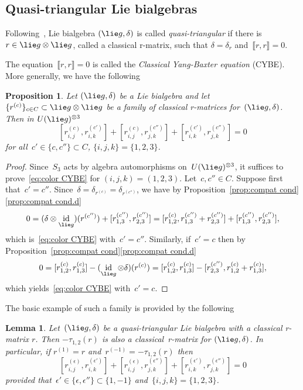 \documentclass[12pt, reqno]{amsart}
\newcommand{\cybe}[1]{\mathbb{\Lbrack}#1,#1\mathbb{\Rbrack}}
\newtheorem{lemma}[theorem]{Lemma}
\newtheorem{proposition}[theorem]{Proposition}
\theoremstyle{definition}
\numberwithin{equation}{section}
\newcommand{\tensor}{\otimes}
\DeclareMathOperator{\id}{id}
\begin{document}
\subsection{Quasi-triangular Lie bialgebras}\label{subs:qtr Lie bialg}
Following~\cite{Drinf}, Lie bialgebra $(\lie g,\delta)$ is 
called {\em quasi-triangular} if there
is $r\in\lie g\tensor \lie g$, called a
classical r-matrix, such that
$\delta=\delta_{r}$
and~$\cybe{r}=0$. 

The equation~$\cybe{r}=0$ is called the {\em Classical Yang-Baxter equation} (CYBE). 
More generally, we have the following
\begin{proposition}\label{prop:color CYBE}
Let $(\lie g,\delta)$ be a Lie bialgebra and let 
$\{ r^{(c)}\}_{c\in C}\subset \lie g\tensor \lie g$ be a family
of classical r-matrices for~$(\lie g,\delta)$.
Then in $U(\lie g)^{\tensor 3}$
\begin{equation}\label{eq:color CYBE}
[r_{i,j}^{(c)},r_{i,k}^{(c')}]+[r_{i,j}^{(c)},r_{j,k}^{(c'')}]+[r_{i,k}^{(c')},r_{j,k}^{(c'')}]=0
\end{equation}
for all~$c'\in \{c,c''\}\subset C$, $\{i,j,k\}=\{1,2,3\}$.
\end{proposition}
\begin{proof}
Since~$S_3$ acts by algebra automorphisms on~$U(\lie g)^{\tensor 3}$, it suffices
to prove~\eqref{eq:color CYBE} for $(i,j,k)=(1,2,3)$.
Let~$c,c''\in C$.
Suppose first that~$c'=c''$. Since~$\delta=\delta_{r^{(c)}}=
\delta_{r^{(c'')}}$, we have by Proposition~\ref{prop:compat cond}\ref{prop:compat cond.d}
$$
0=(\delta\tensor\id_{\lie g})(r^{(c'')})+[r^{(c'')}_{1,3},
r^{(c'')}_{2,3}]
=[r^{(c)}_{1,2},r^{(c'')}_{1,3}+r^{(c'')}_{2,3}]+
[r^{(c'')}_{1,3},r^{(c'')}_{2,3}],
$$
which is~\eqref{eq:color CYBE} with~$c'=c''$. Similarly, if~$c'=c$ then
by Proposition~\ref{prop:compat cond}\ref{prop:compat cond.d}
$$
0=[r^{(c)}_{1,2},
r^{(c)}_{1,3}]-(\id_{\lie g}\tensor\delta)(r^{(c)}) 
=[r^{(c)}_{1,2},r^{(c)}_{1,3}]-
[r^{(c'')}_{2,3},r^{(c)}_{1,2}+r^{(c)}_{1,3}],
$$
which yields~\eqref{eq:color CYBE} with~$c'=c$.
\end{proof}
The basic example of such a family is provided by the following
\begin{lemma}\label{lem:bas classical family}
Let~$(\lie g,\delta)$ be a quasi-triangular Lie bialgebra
with a classical r-matrix $r$.
Then $-\tau_{1,2}(r)$ is also a classical~r-matrix 
for $(\lie g,\delta)$. In particular, if $r^{(1)}=r$
and~$r^{(-1)}=-\tau_{1,2}(r)$ then 
$$
[r^{(\epsilon)}_{i,j},r^{(\epsilon')}_{i,k}]+
[r^{(\epsilon)}_{i,j},r^{(\epsilon'')}_{j,k}]+
[r^{(\epsilon')}_{i,k},r^{(\epsilon'')}_{j,k}]=0
$$
provided that~$\epsilon'\in\{\epsilon,\epsilon''\}\subset\{1,-1\}$ and~$\{i,j,k\}=\{1,2,3\}$.
\end{lemma}
\end{document}
